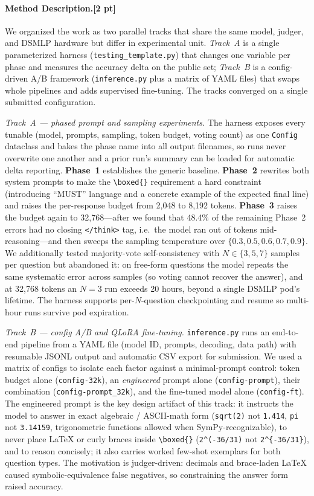 \documentclass{article}
\begin{document}
\paragraph{Method Description.[2 pt]}
We organized the work as two parallel tracks that share the same model, judger, and DSMLP
hardware but differ in experimental unit. \emph{Track~A} is a single parameterized harness
(\texttt{testing\_template.py}) that changes one variable per phase and measures the accuracy
delta on the public set; \emph{Track~B} is a config-driven A/B framework (\texttt{inference.py}
plus a matrix of YAML files) that swaps whole pipelines and adds supervised fine-tuning. The
tracks converged on a single submitted configuration.

\emph{Track~A — phased prompt and sampling experiments.} The harness exposes every tunable
(model, prompts, sampling, token budget, voting count) as one \texttt{Config} dataclass and bakes
the phase name into all output filenames, so runs never overwrite one another and a prior run's
summary can be loaded for automatic delta reporting. \textbf{Phase~1} establishes the generic
baseline. \textbf{Phase~2} rewrites both system prompts to make the
\texttt{\textbackslash boxed\{\}} requirement a hard constraint (introducing ``MUST'' language and
a concrete example of the expected final line) and raises the per-response budget from 2{,}048 to
8{,}192 tokens. \textbf{Phase~3} raises the budget again to 32{,}768—after we found that 48.4\% of
the remaining Phase~2 errors had no closing \texttt{</think>} tag, i.e.\ the model ran out of
tokens mid-reasoning—and then sweeps the sampling temperature over
$\{0.3, 0.5, 0.6, 0.7, 0.9\}$. We additionally tested majority-vote self-consistency with
$N \in \{3, 5, 7\}$ samples per question but {abandoned} it: on free-form questions the model
repeats the same systematic error across samples (so voting cannot recover the answer), and at
32{,}768 tokens an $N{=}3$ run exceeds 20 hours, beyond a single DSMLP pod's lifetime. The harness
supports per-$N$-question checkpointing and resume so multi-hour runs survive pod expiration.

\emph{Track~B — config A/B and QLoRA fine-tuning.} \texttt{inference.py} runs an end-to-end
pipeline from a YAML file (model ID, prompts, decoding, data path) with resumable JSONL output and
automatic CSV export for submission. We used a matrix of configs to isolate each factor against a
minimal-prompt control: token budget alone (\texttt{config-32k}), an \emph{engineered} prompt
alone (\texttt{config-prompt}), their combination (\texttt{config-prompt\_32k}), and the
fine-tuned model alone (\texttt{config-ft}). The engineered prompt is the key design artifact of
this track: it instructs the model to answer in exact algebraic / ASCII-math form
(\texttt{sqrt(2)} not \texttt{1.414}, \texttt{pi} not \texttt{3.14159}, trigonometric functions
allowed when SymPy-recognizable), to never place LaTeX or curly braces inside
\texttt{\textbackslash boxed\{\}} (\texttt{2\^{}(-36/31)} not \texttt{2\^{}\{-36/31\}}), and to
reason concisely; it also carries worked few-shot exemplars for both question types. The
motivation is judger-driven: decimals and brace-laden LaTeX caused symbolic-equivalence false
negatives, so constraining the answer form raised accuracy. 
\end{document}
